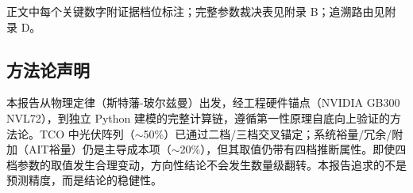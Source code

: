 正文中每个关键数字附证据档位标注；完整参数裁决表见附录 B；追溯路由见附录 D。

\subsection*{方法论声明}

本报告从物理定律（斯特藩-玻尔兹曼）出发，经工程硬件锚点（NVIDIA GB300 NVL72），到独立 Python 建模的完整计算链，遵循第一性原理自底向上验证的方法论。TCO 中光伏阵列（$\sim$50\%）已通过二档/三档交叉锚定；系统裕量/冗余/附加（AIT裕量）仍是主导成本项（$\sim$20\%），但其取值仍带有四档推断属性。即使四档参数的取值发生合理变动，方向性结论不会发生数量级翻转。本报告追求的不是预测精度，而是结论的稳健性。

\endinput
